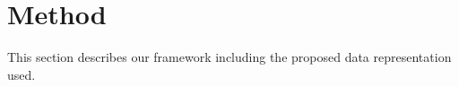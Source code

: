 


\section{Method}


This section describes our framework including the proposed data representation used.


